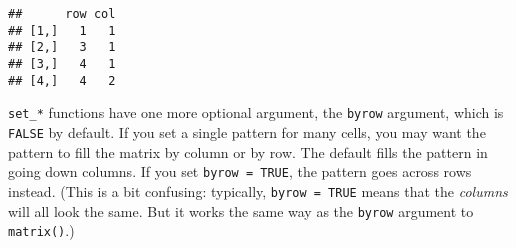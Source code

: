 \documentclass[]{article}
\newenvironment{Shaded}{\begin{snugshade}}{\end{snugshade}}
\newcommand{\KeywordTok}[1]{\textcolor[rgb]{0.13,0.29,0.53}{\textbf{#1}}}
\newcommand{\DataTypeTok}[1]{\textcolor[rgb]{0.13,0.29,0.53}{#1}}
\newcommand{\DecValTok}[1]{\textcolor[rgb]{0.00,0.00,0.81}{#1}}
\newcommand{\StringTok}[1]{\textcolor[rgb]{0.31,0.60,0.02}{#1}}
\newcommand{\CommentTok}[1]{\textcolor[rgb]{0.56,0.35,0.01}{\textit{#1}}}
\newcommand{\OtherTok}[1]{\textcolor[rgb]{0.56,0.35,0.01}{#1}}
\newcommand{\OperatorTok}[1]{\textcolor[rgb]{0.81,0.36,0.00}{\textbf{#1}}}
\newcommand{\NormalTok}[1]{#1}
\begin{document}
\begin{verbatim}
##      row col
## [1,]   1   1
## [2,]   3   1
## [3,]   4   1
## [4,]   4   2
\end{verbatim}

\FloatBarrier

\texttt{set\_*} functions have one more optional argument, the
\texttt{byrow} argument, which is \texttt{FALSE} by default. If you set
a single pattern for many cells, you may want the pattern to fill the
matrix by column or by row. The default fills the pattern in going down
columns. If you set \texttt{byrow\ =\ TRUE}, the pattern goes across
rows instead. (This is a bit confusing: typically,
\texttt{byrow\ =\ TRUE} means that the \emph{columns} will all look the
same. But it works the same way as the \texttt{byrow} argument to
\texttt{matrix()}.)

\begin{Shaded}
\end{Shaded}
\end{document}
